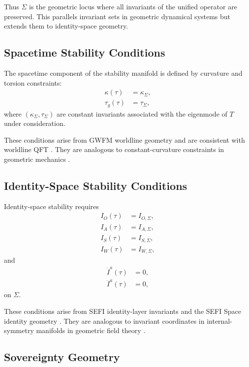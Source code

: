 \documentclass[aip,jmp,reprint,onecolumn,nofootinbib]{revtex4-2}
\begin{document}
Thus $\Sigma$ is the geometric locus where all invariants of the unified operator are 
preserved. This parallels invariant sets in geometric dynamical systems 
\cite{KatokHasselblatt} but extends them to identity-space geometry.

\subsection{Spacetime Stability Conditions}

The spacetime component of the stability manifold is defined by curvature and torsion 
constraints:
\begin{align}
\kappa(\tau) &= \kappa_\Sigma, \\
\tau_g(\tau) &= \tau_\Sigma,
\end{align}
where $(\kappa_\Sigma,\tau_\Sigma)$ are constant invariants associated with the eigenmode 
of $T$ under consideration.

These conditions arise from GWFM worldline geometry \cite{DuttonElectronField2026} and 
are consistent with worldline QFT \cite{Polyakov1987,Strassler1992,Schubert2001}. They 
are analogous to constant-curvature constraints in geometric mechanics 
\cite{ArnoldMechanics}.

\subsection{Identity-Space Stability Conditions}

Identity-space stability requires
\begin{align}
I_O(\tau) &= I_{O,\Sigma}, \\
I_A(\tau) &= I_{A,\Sigma}, \\
I_S(\tau) &= I_{S,\Sigma}, \\
I_W(\tau) &= I_{W,\Sigma},
\end{align}
and
\begin{align}
\dot{I}^a(\tau) &= 0, \\
\ddot{I}^a(\tau) &= 0,
\end{align}
on $\Sigma$.

These conditions arise from SEFI identity-layer invariants \cite{DuttonSEFI2026} and the 
SEFI Space identity geometry \cite{DuttonSEFISpace2026}. They are analogous to invariant 
coordinates in internal-symmetry manifolds in geometric field theory 
\cite{Nakahara,Frankel}.

\subsection{Sovereignty Geometry}
\end{document}
